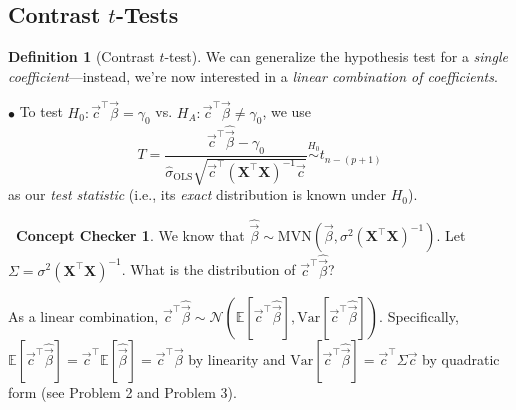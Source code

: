 \documentclass[12pt,oneside]{article}
\newcommand{\E}{\mathbb{E}}
\newcommand{\Var}{\text{Var}}
\newcommand{\OLS}{\text{OLS}}
\newcommand{\N}{\mathcal{N}}
\newcommand{\MVN}{\text{MVN}}
\newcommand{\simnull}{\overset{H_0}{\sim}}
\theoremstyle{definition}
\newtheorem{definition}{Definition}
\newtheorem{concept}{\faPen \ Concept Checker}
\theoremstyle{remark}
\begin{document}
\subsection{Contrast $t$-Tests}

\begin{definition}[Contrast $t$-test]
We can generalize the hypothesis test for a \textit{single coefficient}—instead, we're now interested in a \textit{linear combination of coefficients}.

$\bullet$ To test $H_0: \vec{c}^{\top} \vec{\beta} = \gamma_0$ vs. $H_A: \vec{c}^{\top} \vec{\beta} \neq \gamma_0$, we use \[T = \frac{\vec{c}^{\top} \widehat{\vec{\beta}} - \gamma_0}{\hat{\sigma}_{\OLS} \sqrt{\vec{c}^{\top} (\boldsymbol{X}^{\top} \boldsymbol{X})^{-1} \vec{c}}} \simnull t_{n - (p + 1)}\] as our \textit{test statistic} (i.e., its \textit{exact} distribution is known under $H_0$).
\end{definition}

\begin{concept}
We know that $\widehat{\vec{\beta}} \sim \MVN \left( \vec{\beta}, \sigma^2 (\boldsymbol{X}^{\top} \boldsymbol{X})^{-1} \right)$. Let $\Sigma = \sigma^2 (\boldsymbol{X}^{\top} \boldsymbol{X})^{-1}$. What is the distribution of $\vec{c}^{\top} \widehat{\vec{\beta}}$?
\end{concept}

\begin{solutionbox}
As a linear combination, $\vec{c}^{\top} \widehat{\vec{\beta}} \sim \N(\E[\vec{c}^{\top} \widehat{\vec{\beta}}], \Var[\vec{c}^{\top} \widehat{\vec{\beta}}])$. Specifically, $\E[\vec{c}^{\top} \widehat{\vec{\beta}}] = \vec{c}^{\top} \E[\widehat{\vec{\beta}}] = \vec{c}^{\top} \vec{\beta}$ by linearity and $\Var[\vec{c}^{\top} \widehat{\vec{\beta}}] = \vec{c}^{\top} \Sigma \vec{c}$ by quadratic form (see Problem 2 and Problem 3).
\end{solutionbox}


\end{document}
